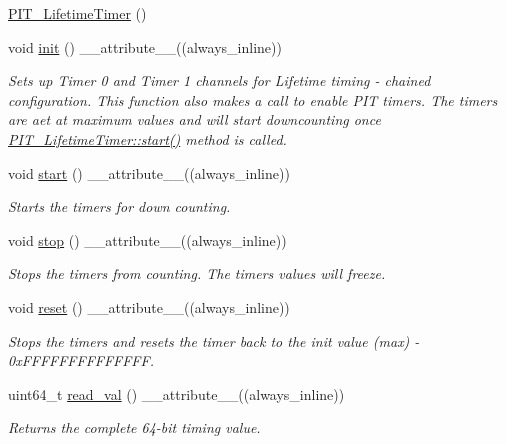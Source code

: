\begin{DoxyCompactItemize}
\item 
\hyperlink{classPIT__LifetimeTimer_a826797e75688ab4e7cd5c8854fa6a7c0}{P\+I\+T\+\_\+\+Lifetime\+Timer} ()
\item 
void \hyperlink{classPIT__LifetimeTimer_ad1c585d138123be94769afcca87f2dc6}{init} () \+\_\+\+\_\+attribute\+\_\+\+\_\+((always\+\_\+inline))
\begin{DoxyCompactList}\small\item\em Sets up Timer 0 and Timer 1 channels for Lifetime timing -\/ chained configuration. This function also makes a call to enable P\+IT timers. The timers are aet at maximum values and will start downcounting once \hyperlink{classPIT__LifetimeTimer_a6feabeff2529cabaf27ef53d027a4fc9}{P\+I\+T\+\_\+\+Lifetime\+Timer\+::start()} method is called. \end{DoxyCompactList}\item 
void \hyperlink{classPIT__LifetimeTimer_a6feabeff2529cabaf27ef53d027a4fc9}{start} () \+\_\+\+\_\+attribute\+\_\+\+\_\+((always\+\_\+inline))
\begin{DoxyCompactList}\small\item\em Starts the timers for down counting. \end{DoxyCompactList}\item 
void \hyperlink{classPIT__LifetimeTimer_a92543f292044725b1dea4d009e01d9e4}{stop} () \+\_\+\+\_\+attribute\+\_\+\+\_\+((always\+\_\+inline))
\begin{DoxyCompactList}\small\item\em Stops the timers from counting. The timers values will freeze. \end{DoxyCompactList}\item 
void \hyperlink{classPIT__LifetimeTimer_a5c1c38cfa6c7a049a495ee3d89e13276}{reset} () \+\_\+\+\_\+attribute\+\_\+\+\_\+((always\+\_\+inline))
\begin{DoxyCompactList}\small\item\em Stops the timers and resets the timer back to the init value (max) -\/ 0x\+F\+F\+F\+F\+F\+F\+F\+F\+F\+F\+F\+F\+FF. \end{DoxyCompactList}\item 
uint64\+\_\+t \hyperlink{classPIT__LifetimeTimer_a4ee08cce7812322a7a10fcba0463476c}{read\+\_\+val} () \+\_\+\+\_\+attribute\+\_\+\+\_\+((always\+\_\+inline))
\begin{DoxyCompactList}\small\item\em Returns the complete 64-\/bit timing value. \end{DoxyCompactList}\item 

\end{DoxyCompactItemize}
